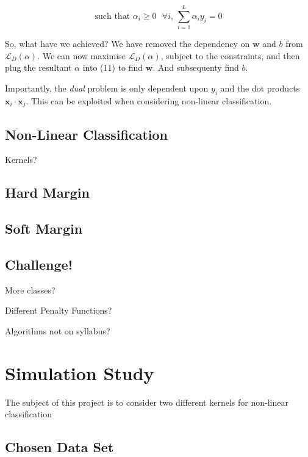 \documentclass[10pt, a4paper,reqno]{amsart}
\begin{document}
\begin{equation}
\text{such that }\alpha_i\geq0\text{ }\forall{i}\text{, }\sum_{i=1}^{L}\alpha_i y_i = 0
\end{equation}

So, what have we achieved? We have removed the dependency on $\mathbf{w}$ and $b$ from $\mathcal{L}_D(\alpha)$. We can now maximise $\mathcal{L}_D(\alpha)$, subject to the constraints, and then plug the resultant $\alpha$ into (11) to find $\mathbf{w}$. And subsequenty find $b$.

Importantly, the \emph{dual} problem is only dependent upon $y_i$ and the dot products $\mathbf{x}_i\cdot\mathbf{x}_j$. This can be exploited when considering non-linear classification.

\subsection{Non-Linear Classification}

Kernels?




\subsection{Hard Margin}

\subsection{Soft Margin}

\subsection{Challenge!}

More classes?

Different Penalty Functions?

Algorithms not on syllabus?

\section{Simulation Study}

The subject of this project is to consider two different kernels for non-linear classification

\subsection{Chosen Data Set}

\end{document}
